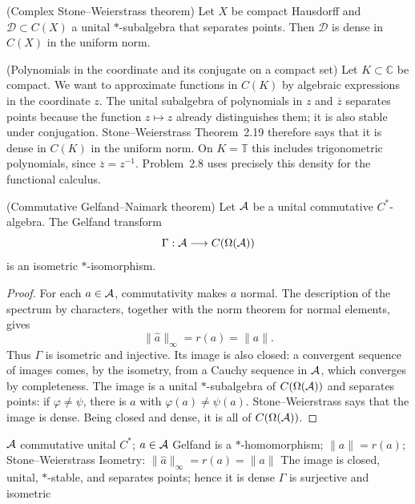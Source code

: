 \begin{cthteorema}{(Complex Stone--Weierstrass theorem)}
Let $X$ be compact Hausdorff and $\mathcal D\subset C(X)$ a unital
$*$-subalgebra that separates points. Then $\mathcal D$ is dense in $C(X)$
in the uniform norm.
\end{cthteorema}

\begin{cthejemplo}{(Polynomials in the coordinate and its conjugate on a compact set)}
Let $K\subset\mathbb C$ be compact. We want to approximate functions in
$C(K)$ by algebraic expressions in the coordinate $z$. The unital
subalgebra of polynomials in $z$ and $\overline z$ separates points because
the function $z\mapsto z$ already distinguishes them; it is also stable
under conjugation. Stone--Weierstrass Theorem~2.19 therefore says that it
is dense in $C(K)$ in the uniform norm.
On $K=\mathbb T$ this includes trigonometric polynomials, since
$\overline z=z^{-1}$. Problem~2.8 uses precisely this density for the
functional calculus.
\end{cthejemplo}

\begin{cthteorema}{(Commutative Gelfand--Naimark theorem)}
Let $\mathcal A$ be a unital commutative $C^*$-algebra. The Gelfand transform
\[
 \Gamma:\mathcal A\longrightarrow C(\Omega(\mathcal A))
\]
is an isometric $*$-isomorphism.
\end{cthteorema}

\begin{proof}[Proof]
For each $a\in\mathcal A$, commutativity makes $a$ normal. The description of
the spectrum by characters, together with the norm theorem for normal
elements, gives
\[
 \|\widehat a\|_\infty=r(a)=\|a\|.
\]
Thus $\Gamma$ is isometric and injective. Its image is also closed: a
convergent sequence of images comes, by the isometry, from a Cauchy sequence
in $\mathcal A$, which converges by completeness. The image is a unital
$*$-subalgebra of $C(\Omega(\mathcal A))$ and separates points: if
$\varphi\neq\psi$, there is $a$ with $\varphi(a)\neq\psi(a)$.
Stone--Weierstrass says that the image is dense. Being closed and dense,
it is all of $C(\Omega(\mathcal A))$.
\end{proof}

\proofdiagrambranch
{$\mathcal A$ commutative unital $C^*$; $a\in\mathcal A$}
{Gelfand is a $*$-homomorphism; $\|a\|=r(a)$; Stone--Weierstrass}
{Isometry: $\|\widehat a\|_\infty=r(a)=\|a\|$}
{The image is closed, unital, $*$-stable, and separates points; hence it is dense}
{$\Gamma$ is surjective and isometric}

